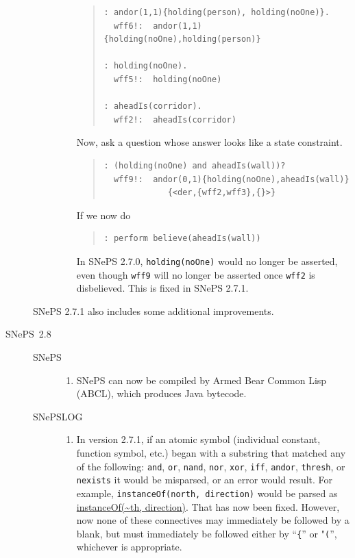 \documentclass{book}
\begin{document}
\begin{description}
\begin{description}
\begin{enumerate}
\begin{quote}
\begin{verbatim}
: andor(1,1){holding(person), holding(noOne)}.
  wff6!:  andor(1,1){holding(noOne),holding(person)}    

: holding(noOne).
  wff5!:  holding(noOne)    

: aheadIs(corridor).
  wff2!:  aheadIs(corridor)    
\end{verbatim}
\end{quote}
Now, ask a question whose answer looks like a state constraint.
\begin{quote}
\begin{verbatim}
: (holding(noOne) and aheadIs(wall))?
  wff9!:  andor(0,1){holding(noOne),aheadIs(wall)}
             {<der,{wff2,wff3},{}>}  
\end{verbatim}
\end{quote}
If we now do
\begin{quote}
\begin{verbatim}
: perform believe(aheadIs(wall))
\end{verbatim}
\end{quote}
In SNePS 2.7.0, \texttt{holding(noOne)} would no longer be asserted, even though
\texttt{wff9} will no longer be asserted once \texttt{wff2} is
disbelieved. This is fixed in SNePS 2.7.1.
\end{enumerate}
  \end{description}
SNePS 2.7.1 also includes some additional improvements.

\item[SNePS~2.8]\mbox{}
  \begin{description}
  \item[SNePS]\mbox{}
    \begin{enumerate}
    \item SNePS can now be compiled by Armed Bear Common Lisp (ABCL), which
       produces Java bytecode.
    \end{enumerate}

  \item[SNePSLOG]\mbox{}
\begin{enumerate}
\item In version 2.7.1, if an atomic symbol (individual constant, function
  symbol, etc.) began with a substring that matched any of the following:
  \texttt{and}, \texttt{or}, \texttt{nand}, \texttt{nor}, \texttt{xor},
  \texttt{iff}, \texttt{andor}, \texttt{thresh}, or \texttt{nexists} it would be
  misparsed, or an error would result.  For example, \texttt{instanceOf(north,
    direction)} would be parsed as \url{instanceOf(~th, direction)}.  That
  has now been fixed.  However, now none of these connectives may immediately be
  followed by a blank, but must immediately be followed either by
  ``\texttt{\{}'' or "\texttt{(}'', whichever is appropriate.


\end{enumerate}
\end{description}
\end{description}
\end{document}
